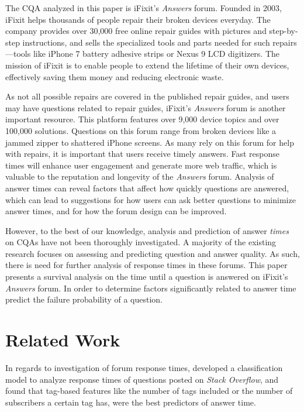 \documentclass[12pt]{article}
\begin{document}
    The CQA analyzed in this paper is iFixit's \textit{Answers} forum. Founded in 2003, iFixit helps thousands of people repair their broken devices everyday. The company provides over 30,000 free online repair guides with pictures and step-by-step instructions, and sells the specialized tools and parts needed for such repairs---tools like iPhone 7 battery adhesive strips or Nexus 9 LCD digitizers. The mission of iFixit is to enable people to extend the lifetime of their own devices, effectively saving them money and reducing electronic waste. 
    
    As not all possible repairs are covered in the published repair guides, and users may have questions related to repair guides, iFixit's \textit{Answers} forum is another important resource. This platform features over 9,000 device topics and over 100,000 solutions. Questions on this forum range from broken devices like a jammed zipper to shattered iPhone screens. As many rely on this forum for help with repairs, it is important that users receive timely answers. Fast response times will enhance user engagement and generate more web traffic, which is valuable to the reputation and longevity of the \textit{Answers} forum. Analysis of answer times can reveal factors that affect how quickly questions are answered, which can lead to suggestions for how users can ask better questions to minimize answer times, and for how the forum design can be improved. 
    
    However, to the best of our knowledge, analysis and prediction of answer \textit{times} on CQAs have not been thoroughly investigated. A majority of the existing research focuses on assessing and predicting question and answer quality. As such, there is need for further analysis of response times in these forums. This paper presents a survival analysis on the time until a question is answered on iFixit's \textit{Answers} forum. In order to determine factors significantly related to answer time predict the failure probability of a question.

\section{Related Work}

    In regards to investigation of forum response times, \citep{Bhat2014} developed a classification model to analyze response times of questions posted on \textit{Stack Overflow}, and found that tag-based features like the number of tags included or the number of subscribers a certain tag has, were the best predictors of answer time. 
\end{document}
